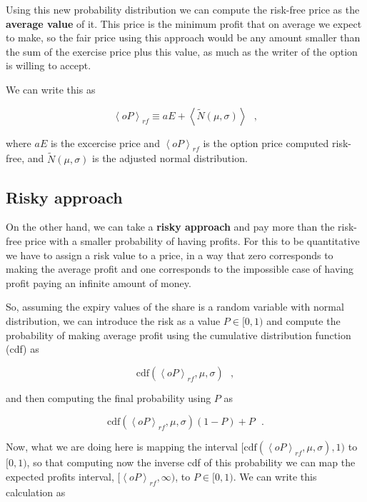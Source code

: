 \documentclass[8 pt]{article}
\newcommand{\avg}[1]{\left\langle #1 \right\rangle}
\begin{document}
Using this new probability distribution we can compute the risk-free price as the \textbf{average value} of it. This price is the minimum profit that on average we expect to make, so the fair price using this approach would be any amount smaller than the sum of the exercise price plus this value, as much as the writer of the option is willing to accept.

We can write this as

\begin{equation}
  \avg{oP}_{rf} \equiv aE + \avg{\tilde N(\mu, \sigma)} ~~~ ,
\end{equation}

where $aE$ is the excercise price and $\avg{oP}_{rf}$ is the option price computed risk-free, and $\tilde N(\mu, \sigma)$ is the adjusted normal distribution.

\subsection{Risky approach}

On the other hand, we can take a \textbf{risky approach} and pay more than the risk-free price with a smaller probability of having profits. For this to be quantitative we have to assign a risk value to a price, in a way that zero corresponds to making the average profit and one corresponds to the impossible case of having profit paying an infinite amount of money.

So, assuming the expiry values of the share is a random variable with normal distribution, we can introduce the risk as a value $P \in [0, 1)$ and compute the probability of making average profit using the cumulative distribution function (cdf) as

\begin{equation*}
  \text{cdf}(\avg{oP}_{rf}, \mu, \sigma) ~~~ ,
\end{equation*}

and then computing the final probability using $P$ as

\begin{equation*}
  \text{cdf}(\avg{oP}_{rf}, \mu, \sigma)(1 - P) + P ~~~ .
\end{equation*}

Now, what we are doing here is mapping the interval $[\text{cdf}(\avg{oP}_{rf}, \mu, \sigma), 1)$ to $[0, 1)$, so that computing now the inverse cdf of this probability we can map the expected profits interval, $[\avg{oP}_{rf}, \infty)$, to $P \in [0, 1)$. We can write this calculation as
\end{document}
